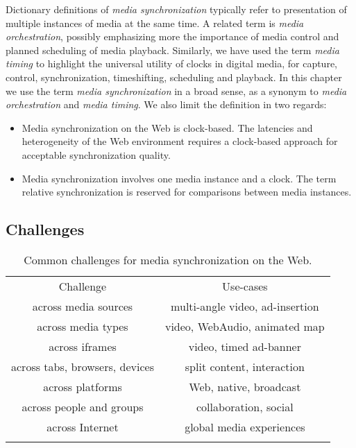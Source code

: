 Dictionary definitions of \emph{media synchronization} typically refer to
presentation of multiple instances of media at the same time. A related term
is \emph{media orchestration}, possibly emphasizing more the importance of
media control and planned scheduling of media playback. Similarly, we have
used the term \emph{media timing} to highlight the universal utility of clocks
in digital media, for capture, control, synchronization, timeshifting,
scheduling and playback. In this chapter we use the term \emph{media
synchronization} in a broad sense, as a synonym to \emph{media orchestration}
and \emph{media timing}. We also limit the definition in two regards:

\begin{itemize}
\item{Media synchronization on the Web is clock-based. The latencies and heterogeneity of the Web environment requires a clock-based approach for acceptable synchronization quality.}
\item{Media synchronization involves one media instance and a clock. The term relative synchronization is reserved for comparisons between media instances.}
\end{itemize}

\subsection{Challenges}

\begin{table}
\centering
\caption{Common challenges for media synchronization on the Web.}
\label{tab:challenges}
\setlength{\tabcolsep}{10pt}
\begin{tabular}{cc}
\hline\noalign{\smallskip}
Challenge & Use-cases \\
\noalign{\smallskip}\svhline\noalign{\smallskip}
across media sources & multi-angle video, ad-insertion\\
across media types & video, WebAudio, animated map\\
across iframes & video, timed ad-banner\\
across tabs, browsers, devices & split content, interaction\\
across platforms & Web, native, broadcast\\
across people and groups & collaboration, social\\
across Internet & global media experiences\\
\noalign{\smallskip}\hline\noalign{\smallskip}
\end{tabular}
\end{table}

